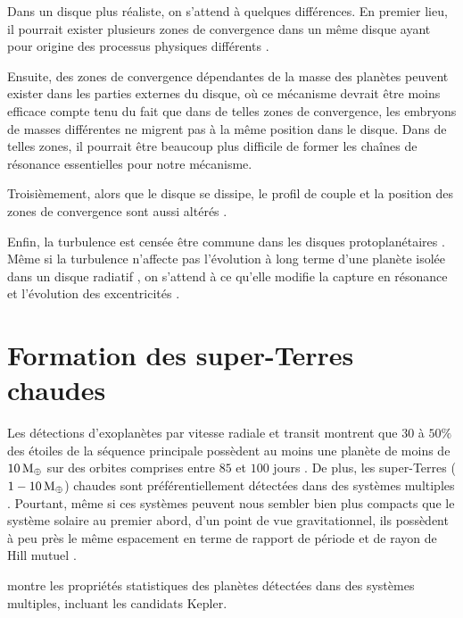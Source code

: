 \bigskip

Dans un disque plus réaliste, on s'attend à quelques différences. En premier lieu, il pourrait exister plusieurs zones de convergence dans un même disque ayant pour origine des processus physiques différents \citep{lyra2010orbital, hasegawa2011origin}. 

Ensuite, des zones de convergence dépendantes de la masse des planètes peuvent exister dans les parties externes du disque, où
ce mécanisme devrait être moins efficace compte tenu du fait que dans de telles zones de convergence, les embryons de masses
différentes ne migrent pas à la même position dans le disque. Dans de telles zones, il pourrait être beaucoup plus difficile de
former les chaînes de résonance essentielles pour notre mécanisme.

Troisièmement, alors que le disque se dissipe, le profil de couple et la position des zones de convergence sont aussi altérés \citep{lyra2010orbital, horn2012orbital}. 

Enfin, la turbulence est censée être commune dans les disques protoplanétaires \citep{armitage2011dynamics}. Même si la turbulence n'affecte pas l'évolution à long terme d'une planète isolée dans un disque radiatif \citep{pierens2012protoplanetary}, on s'attend à ce qu'elle modifie la capture en résonance et l'évolution des excentricités \citep[voir][]{pierens2011dynamics}.

\section{Formation des super-Terres chaudes}\label{sec:4.2}
Les détections d'exoplanètes par vitesse radiale et transit montrent que $30$ à $50\%$ des étoiles de la séquence principale possèdent au moins une planète de moins de $10\mathrm{\thinspace M_\oplus}$ sur des orbites comprises entre $85$ et $100$ jours \citep{mayor2011road, howard2010occurrence, howard2012occurrence, fressin2013false}. De plus, les super-Terres ($1-10\mathrm{\thinspace M_\oplus}$) chaudes sont préférentiellement détectées dans des systèmes multiples \citep{udry2007statistical, lissauer2011architecture}. Pourtant, même si ces systèmes peuvent nous sembler bien plus compacts que le système solaire au premier abord, d'un point de vue gravitationnel, ils possèdent à peu près le même espacement en terme de rapport de période et de rayon de Hill mutuel \citep{fang2013planetary}.


 montre les propriétés statistiques des planètes détectées dans des systèmes multiples, incluant les candidats Kepler.%

